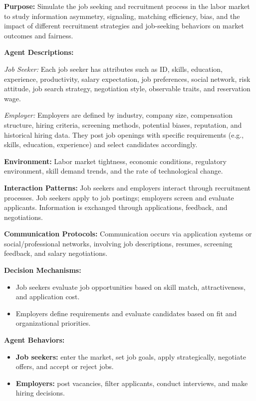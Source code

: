 \documentclass{article}
\theoremstyle{definition}
\theoremstyle{theorem}
\theoremstyle{proof}
\theoremstyle{remark}
\begin{document}
\begin{tcolorbox}[
  colback=gray!4,
  colframe=gray!60!black,
  colbacktitle=gray!40!black,
  coltitle=white,
  title=ODD Protocol: Job Market Simulation,
  fonttitle=\bfseries,
  sharp corners,
  boxrule=0.5pt,
]

\textbf{Purpose:} Simulate the job seeking and recruitment process in the labor market to study information asymmetry, signaling, matching efficiency, bias, and the impact of different recruitment strategies and job-seeking behaviors on market outcomes and fairness.

\textbf{Agent Descriptions:}

\textit{Job Seeker:} Each job seeker has attributes such as ID, skills, education, experience, productivity, salary expectation, job preferences, social network, risk attitude, job search strategy, negotiation style, observable traits, and reservation wage.

\textit{Employer:} Employers are defined by industry, company size, compensation structure, hiring criteria, screening methods, potential biases, reputation, and historical hiring data. They post job openings with specific requirements (e.g., skills, education, experience) and select candidates accordingly.

\textbf{Environment:} Labor market tightness, economic conditions, regulatory environment, skill demand trends, and the rate of technological change.

\textbf{Interaction Patterns:} Job seekers and employers interact through recruitment processes. Job seekers apply to job postings; employers screen and evaluate applicants. Information is exchanged through applications, feedback, and negotiations.

\textbf{Communication Protocols:} Communication occurs via application systems or social/professional networks, involving job descriptions, resumes, screening feedback, and salary negotiations.

\textbf{Decision Mechanisms:}
\begin{itemize}[leftmargin=1.5em]
  \item Job seekers evaluate job opportunities based on skill match, attractiveness, and application cost.
  \item Employers define requirements and evaluate candidates based on fit and organizational priorities.
\end{itemize}

\textbf{Agent Behaviors:}
\begin{itemize}[leftmargin=1.5em]
  \item \textbf{Job seekers:} enter the market, set job goals, apply strategically, negotiate offers, and accept or reject jobs.
  \item \textbf{Employers:} post vacancies, filter applicants, conduct interviews, and make hiring decisions.
\end{itemize}


\end{tcolorbox}
\end{document}
